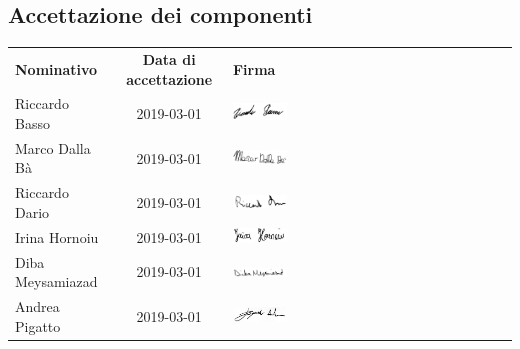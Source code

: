 \subsection{Accettazione dei componenti}
\begin{table}[H]
	\centering\renewcommand{\arraystretch}{1.5}
	
	\begin{tabular}{l c M{0.35\textwidth}}
		
		
		\rowcolorhead 
		{ \textbf{Nominativo}} &
		{ \textbf{Data di accettazione}} &
		{ \textbf{Firma}}  \\
		
		\rowcolorlight
		Riccardo Basso & 2019-03-01 &   	\includegraphics[width=0.2\textwidth]{res/images/firme/RiccardoB.png}\\  
		\rowcolordark
		Marco Dalla Bà & 2019-03-01 &     	\includegraphics[width=0.2\textwidth]{res/images/firme/MarcoD.png}\\  
		\rowcolorlight
		Riccardo Dario & 2019-03-01 &   	\includegraphics[width=0.2\textwidth]{res/images/firme/RiccardoD.png}\\  
		\rowcolordark
		Irina Hornoiu & 2019-03-01 &   	\includegraphics[width=0.2\textwidth]{res/images/firme/IrinaH.png}\\  
		\rowcolorlight
		Diba Meysamiazad & 2019-03-01 &   	\includegraphics[width=0.2\textwidth]{res/images/firme/DibaM.png}\\ 
		\rowcolordark
		Andrea Pigatto & 2019-03-01 &   	\includegraphics[width=0.2\textwidth]{res/images/firme/AndreaP.png}\\   
	\end{tabular}
\end{table}

